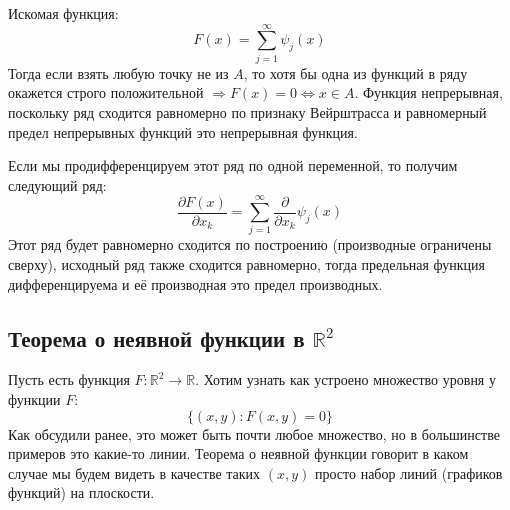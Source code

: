 \documentclass[12pt]{article}
\newcommand{\MR}{\mathbb{R}}
\theoremstyle{definition}
\begin{document}
Искомая функция: 
$$
	F(x) = \displaystyle\sum\limits_{j=1}^{\infty}\psi_j(x)
$$ 
Тогда если взять любую точку не из $A$, то хотя бы одна из функций в ряду окажется строго положительной $\Rightarrow F(x) = 0 \Leftrightarrow x \in A$. Функция непрерывная, поскольку ряд сходится равномерно по признаку Вейрштрасса и равномерный предел непрерывных функций это непрерывная функция.

Если мы продифференцируем этот ряд по одной переменной, то получим следующий ряд:
$$
	\dfrac{\partial F(x)}{\partial x_k} = \displaystyle\sum\limits_{j=1}^{\infty}\dfrac{\partial}{\partial x_k}\psi_j(x)
$$
Этот ряд будет равномерно сходится по построению (производные ограничены сверху), исходный ряд также сходится равномерно, тогда предельная функция дифференцируема и её производная это предел производных.

\newpage
\subsection*{Теорема о неявной функции в $\MR^2$}
Пусть есть функция $F\colon \MR^2 \to \MR$. Хотим узнать как устроено множество уровня у функции $F$:
$$
	\{(x,y)\colon F(x,y) = 0\}
$$
Как обсудили ранее, это может быть почти любое множество, но в большинстве примеров это какие-то линии. Теорема о неявной функции говорит в каком случае мы будем видеть в качестве таких $(x,y)$ просто набор линий (графиков функций) на плоскости.
\end{document}
